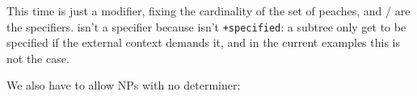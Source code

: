 \documentclass[11pt,a4paper]{article}
\begin{document}
\begin{figure}[ht]
\begin{minipage}[t]{0.45\linewidth}
{{   }
}
\end{minipage}
\hspace*{\fill}
\caption{}\label{he ate the/some six ripe peaches .}
\end{figure}

This time  is just a modifier, fixing the cardinality of the
set of peaches, and / are the specifiers.  isn't
a specifier because  isn't \texttt{+specified}:
a subtree only get to be specified if the external context demands it,
and in the current examples this is not the case.

\newpage
We also have to allow NPs with no determiner:
\end{document}
